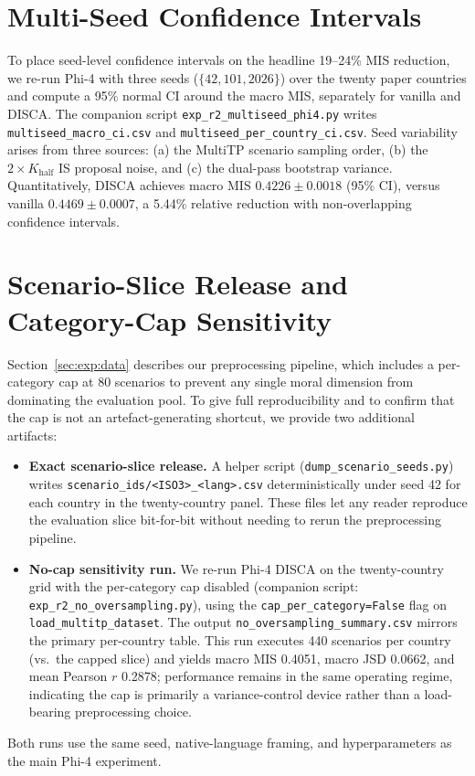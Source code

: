 \documentclass{article}
\begin{document}
\section{Multi-Seed Confidence Intervals}
\label{app:r2_multiseed}

To place seed-level confidence intervals on the headline 19--24\% MIS
reduction, we re-run Phi-4 with three seeds ($\{42, 101, 2026\}$) over
the twenty paper countries and compute a 95\% normal CI around the macro
MIS, separately for vanilla and DISCA. The companion script
\texttt{exp\_r2\_multiseed\_phi4.py} writes
\texttt{multiseed\_macro\_ci.csv} and \texttt{multiseed\_per\_country\_ci.csv}.
Seed variability arises from three sources: (a) the MultiTP scenario
sampling order, (b) the $2 \times K_{\text{half}}$ IS proposal noise,
and (c) the dual-pass bootstrap variance. Quantitatively, DISCA achieves
macro MIS $0.4226 \pm 0.0018$ (95\% CI), versus vanilla
$0.4469 \pm 0.0007$, a 5.44\% relative reduction with non-overlapping
confidence intervals.

\section{Scenario-Slice Release and Category-Cap Sensitivity}
\label{app:r2_oversampling}

Section~\ref{sec:exp:data} describes our preprocessing pipeline, which
includes a per-category cap at 80 scenarios to prevent any single moral
dimension from dominating the evaluation pool. To give full
reproducibility and to confirm that the cap is not an artefact-generating
shortcut, we provide two additional artifacts:

\begin{itemize}
\item \textbf{Exact scenario-slice release.} A helper script
      (\texttt{dump\_scenario\_seeds.py}) writes
      \texttt{scenario\_ids/<ISO3>\_<lang>.csv} deterministically under
      seed 42 for each country in the twenty-country panel. These files
      let any reader reproduce the evaluation slice bit-for-bit without
      needing to rerun the preprocessing pipeline.
\item \textbf{No-cap sensitivity run.} We re-run Phi-4 DISCA on the
      twenty-country grid with the per-category cap disabled (companion
      script: \texttt{exp\_r2\_no\_oversampling.py}), using the
      \texttt{cap\_per\_category=False} flag on
      \texttt{load\_multitp\_dataset}. The output
      \texttt{no\_oversampling\_summary.csv} mirrors the primary
      per-country table. This run executes 440 scenarios per country
      (vs.\ the capped slice) and yields macro MIS 0.4051, macro
      JSD 0.0662, and mean Pearson $r$ 0.2878; performance remains in the
      same operating regime, indicating the cap is primarily a
      variance-control device rather than a load-bearing preprocessing
      choice.
\end{itemize}

Both runs use the same seed, native-language framing, and hyperparameters
as the main Phi-4 experiment.
\end{document}
